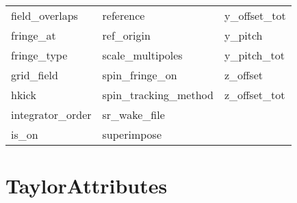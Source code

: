 \begin{tabular}{lll}
field_overlaps              & reference                   & y_offset_tot                \\
fringe_at                   & ref_origin                  & y_pitch                     \\
fringe_type                 & scale_multipoles            & y_pitch_tot                 \\
grid_field                  & spin_fringe_on              & z_offset                    \\
hkick                       & spin_tracking_method        & z_offset_tot                \\
integrator_order            & sr_wake_file                &                             \\
is_on                       & superimpose                 &                             \\
 \bottomrule
 \end{tabular}
 \vfill
 
 \section{TaylorAttributes}
 \label{s:list.taylor}
 
